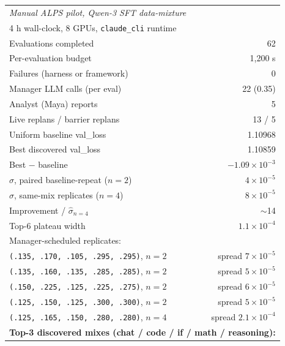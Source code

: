 \documentclass{article}
\newcommand{\alps}{ALPS\xspace}
\newenvironment{addedblock}{\par\color{blue}}{\par}
\begin{document}
\begin{addedblock}
\begin{table}[t]
\centering
\small
\begin{tabular}{l@{\hspace{1.0em}}r}
\toprule
\multicolumn{2}{l}{\emph{Manual \alps pilot, Qwen-3 SFT data-mixture}} \\
\multicolumn{2}{l}{4 h wall-clock, 8 GPUs, \texttt{claude\_cli} runtime} \\
\midrule
Evaluations completed                       & 62 \\
Per-evaluation budget                       & 1{,}200 s \\
Failures (harness or framework)             & 0 \\
Manager LLM calls (per eval)                & 22 (0.35) \\
Analyst (Maya) reports                      & 5 \\
Live replans / barrier replans              & 13 / 5 \\
\midrule
Uniform baseline val\_loss                  & 1.10968 \\
Best discovered val\_loss                   & 1.10859 \\
Best $-$ baseline                           & $-1.09\!\times\!10^{-3}$ \\
$\hat\sigma$, paired baseline-repeat ($n\!=\!2$) & $4\!\times\!10^{-5}$ \\
$\hat\sigma$, same-mix replicates ($n\!=\!4$)    & $8\!\times\!10^{-5}$ \\
Improvement / $\hat\sigma_{n=4}$            & $\sim$14 \\
Top-6 plateau width                         & $1.1\!\times\!10^{-4}$ \\
\midrule
Manager-scheduled replicates: & \\
\quad \texttt{(.135, .170, .105, .295, .295)}, $n\!=\!2$ & spread $7\!\times\!10^{-5}$ \\
\quad \texttt{(.135, .160, .135, .285, .285)}, $n\!=\!2$ & spread $5\!\times\!10^{-5}$ \\
\quad \texttt{(.150, .225, .125, .225, .275)}, $n\!=\!2$ & spread $6\!\times\!10^{-5}$ \\
\quad \texttt{(.125, .150, .125, .300, .300)}, $n\!=\!2$ & spread $5\!\times\!10^{-5}$ \\
\quad \texttt{(.125, .165, .150, .280, .280)}, $n\!=\!4$ & spread $2.1\!\times\!10^{-4}$ \\
\midrule
\multicolumn{2}{l}{\textbf{Top-3 discovered mixes (chat / code / if / math / reasoning):}} \\

\end{tabular}
\end{table}
\end{addedblock}
\end{document}
